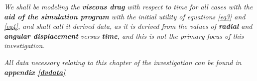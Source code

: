 \textit{We shall be modeling the \textbf{viscous drag} with respect to time for all cases with the \textbf{aid of the simulation program} with the initial utility of equations \ref{eq3} and \ref{eq4}, and shall call it derived data, as it is derived from the values of \textbf{radial} and \textbf{angular displacement} versus \textbf{time}, and this is not the primary focus of this investigation.}

\textit{All data necessary relating to this chapter of the investigation can be found in \textbf{appendix \ref{dvdata}}}


